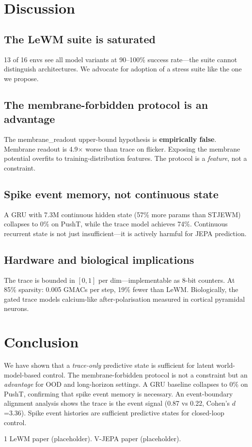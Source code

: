 \documentclass[pdflatex,sn-mathphys-num]{sn-jnl}
\begin{document}
\section{Discussion}

\subsection{The LeWM suite is saturated}
13 of 16 envs see all model variants at 90--100\% success rate---the suite cannot distinguish architectures. We advocate for adoption of a stress suite like the one we propose.

\subsection{The membrane-forbidden protocol is an advantage}
The membrane\_readout upper-bound hypothesis is \textbf{empirically false}. Membrane readout is 4.9$\times$ worse than trace on flicker. Exposing the membrane potential overfits to training-distribution features. The protocol is a \emph{feature}, not a constraint.

\subsection{Spike event memory, not continuous state}
A GRU with 7.3M continuous hidden state (57\% more params than STJEWM) collapses to 0\% on PushT, while the trace model achieves 74\%. Continuous recurrent state is not just insufficient---it is actively harmful for JEPA prediction.

\subsection{Hardware and biological implications}
The trace is bounded in $[0,1]$ per dim---implementable as 8-bit counters. At 85\% sparsity: 0.005 GMACs per step, 19\% fewer than LeWM. Biologically, the gated trace models calcium-like after-polarisation measured in cortical pyramidal neurons.

\section{Conclusion}

We have shown that a \emph{trace-only} predictive state is sufficient for latent world-model-based control. The membrane-forbidden protocol is not a constraint but an \emph{advantage} for OOD and long-horizon settings. A GRU baseline collapses to 0\% on PushT, confirming that spike event memory is necessary. An event-boundary alignment analysis shows the trace is the event signal (0.87 vs 0.22, Cohen's $d$=3.36). Spike event histories are sufficient predictive states for closed-loop control.

\begin{thebibliography}{1}
 LeWM paper (placeholder).
 V-JEPA paper (placeholder).
\end{thebibliography}
\end{document}
